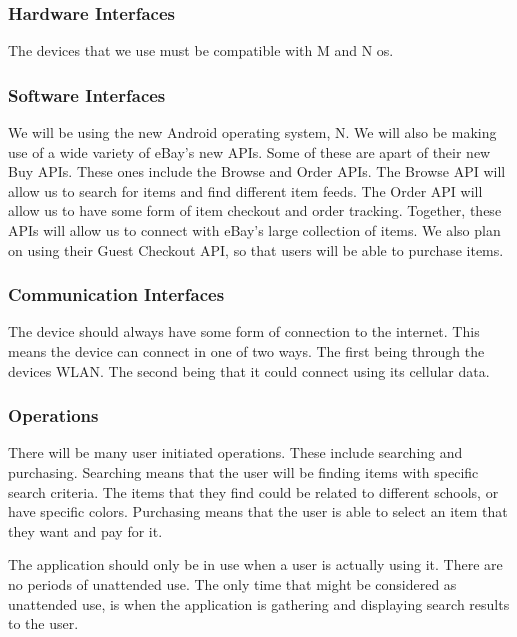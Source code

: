\documentclass[journal,compsoc, 10pt, draftclsnofoot, onecolumn]{IEEEtran}
\begin{document}
\subsubsection{Hardware Interfaces}

The devices that we use must be compatible with M and N os. 

\subsubsection{Software Interfaces}

We will be using the new Android operating system, N. We will also be making use
 of a wide variety of eBay's new APIs. Some of these are apart of their new Buy 
APIs. These ones include the Browse and Order APIs. The Browse API will allow us
 to search for items and find different item feeds. The Order API will allow us 
to have some form of item checkout and order tracking. Together, these APIs
 will allow us to connect with eBay's large collection of items. We also plan 
on using their Guest Checkout API, so that users will be able to purchase items.

\subsubsection{Communication Interfaces}

The device should always have some form of connection to the internet. This 
means the device can connect in one of two ways. The first being through the 
devices WLAN. The second being that it could connect using its cellular data.

\subsubsection{Operations}

There will be many user initiated operations. These include searching and 
purchasing. Searching means that the user will be finding items with specific 
search criteria. The items that they find could be related to different schools,
 or have specific colors. Purchasing means that the user is able to select an 
item that they want and pay for it.\newline

The application should only be in use when a user is actually using it. There 
are no periods of unattended use. The only time that might be considered as 
unattended use, is when the application is gathering and displaying search 
results to the user. 
\end{document}
